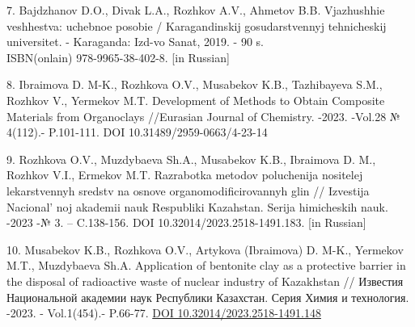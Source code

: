 \begin{references}
7. Bajdzhanov D.O., Divak L.A., Rozhkov A.V., Ahmetov B.B. Vjazhushhie
veshhestva: uchebnoe posobie / Karagandinskij gosudarstvennyj
tehnicheskij universitet. - Karaganda: Izd-vo Sanat, 2019. - 90 s.\\
ISBN(onlain) 978-9965-38-402-8. {[}in Russian{]}

8. Ibraimova D. M-K., Rozhkova O.V., Musabekov K.B., Tazhibayeva S.M.,
Rozhkov V., Yermekov M.T. Development of Methods to Obtain Composite
Materials from Organoclays //Eurasian Journal of Chemistry. -2023.
-Vol.28 № 4(112).- P.101-111. DOI 10.31489/2959-0663/4-23-14

9. Rozhkova O.V., Muzdybaeva Sh.A., Musabekov K.B., Ibraimova D. M.,
Rozhkov V.I., Ermekov M.T. Razrabotka metodov poluchenija nositelej
lekarstvennyh sredstv na osnove organomodificirovannyh glin // Izvestija
Nacional' noj akademii nauk Respubliki Kazahstan. Serija
himicheskih nauk. -2023 -№ 3. -- C.138-156. DOI
10.32014/2023.2518-1491.183. {[}in Russian{]}

10. Musabekov K.B., Rozhkova O.V., Artykova (Ibraimova) D. M-K., Yermekov
M.T., Muzdybaeva Sh.A. Application of bentonite clay as a protective
barrier in the disposal of radioactive waste of nuclear industry of
Kazakhstan // Известия Национальной академии наук Республики Казахстан.
Серия Химия и технология. -2023. - Vol.1(454).- P.66-77.
\href{https://doi.org/10.32014/2023.2518-1491.148}{DOI 10.32014/2023.2518-1491.148}
\end{references}

